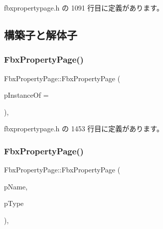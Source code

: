  fbxpropertypage.\+h の 1091 行目に定義があります。



\subsection{構築子と解体子}
\mbox{\label{class_fbx_property_page_a68b9f893133e151f86c3c29a8fccf66d}} 
\subsubsection{\texorpdfstring{Fbx\+Property\+Page()}{FbxPropertyPage()}\hspace{0.1cm}{\footnotesize\ttfamily [1/3]}}
{\footnotesize\ttfamily Fbx\+Property\+Page\+::\+Fbx\+Property\+Page (\begin{DoxyParamCaption}\item[{\hyperlink{class_fbx_property_page}{Fbx\+Property\+Page} $\ast$}]{p\+Instance\+Of = {} }\end{DoxyParamCaption})\hspace{0.3cm}{\ttfamily [inline]}, {\ttfamily [protected]}}



 fbxpropertypage.\+h の 1453 行目に定義があります。

\mbox{\label{class_fbx_property_page_ac6cee403bff8503088a7b425cc8cf02b}} 
\subsubsection{\texorpdfstring{Fbx\+Property\+Page()}{FbxPropertyPage()}\hspace{0.1cm}{\footnotesize\ttfamily [2/3]}}
{\footnotesize\ttfamily Fbx\+Property\+Page\+::\+Fbx\+Property\+Page (\begin{DoxyParamCaption}\item[{const char $\ast$}]{p\+Name,  }\item[{\hyperlink{fbxpropertytypes_8h_a73913a5ddfb20e57c6f25e9e6784bd92}{E\+Fbx\+Type}}]{p\+Type }\end{DoxyParamCaption})\hspace{0.3cm}{\ttfamily [inline]}, {\ttfamily [protected]}}



